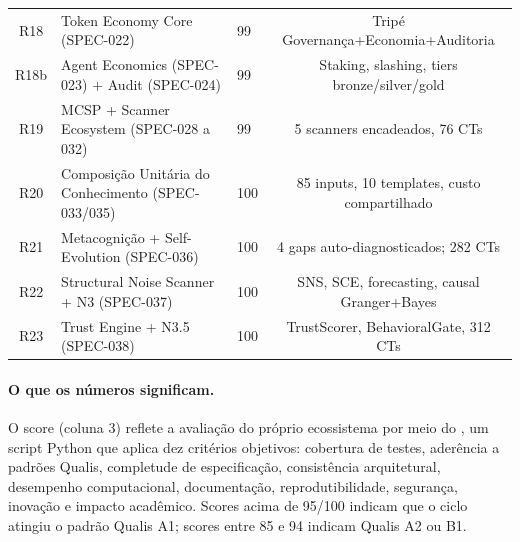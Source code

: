 \begin{table}[htb]
{\begin{tabular}{cllc}
R18 & Token Economy Core (SPEC-022) & 99 & Tripé Governança+Economia+Auditoria \\
R18b & Agent Economics (SPEC-023) + Audit (SPEC-024) & 99 & Staking, slashing, tiers bronze/silver/gold \\
R19 & MCSP + Scanner Ecosystem (SPEC-028 a 032) & 99 & 5 scanners encadeados, 76 CTs \\
R20 & Composição Unitária do Conhecimento (SPEC-033/035) & 100 & 85 inputs, 10 templates, custo compartilhado \\
R21 & Metacognição + Self-Evolution (SPEC-036) & 100 & 4 gaps auto-diagnosticados; 282 CTs \\
R22 & Structural Noise Scanner + N3 (SPEC-037) & 100 & SNS, SCE, forecasting, causal Granger+Bayes \\
R23 & Trust Engine + N3.5 (SPEC-038) & 100 & TrustScorer, BehavioralGate, 312 CTs \\
\bottomrule
\end{tabular}
    }
\end{table}

\paragraph*{O que os números significam.} O score (coluna 3) reflete a
avaliação do próprio ecossistema por meio do ,
um script Python que aplica dez critérios objetivos: cobertura de testes,
aderência a padrões Qualis, completude de especificação, consistência
arquitetural, desempenho computacional, documentação, reprodutibilidade,
segurança, inovação e impacto acadêmico. Scores acima de 95/100 indicam que
o ciclo atingiu o padrão Qualis A1; scores entre 85 e 94 indicam Qualis A2
ou B1.

